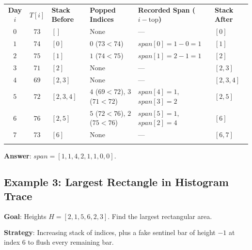 \documentclass[11pt,a4paper]{article}
\theoremstyle{definition}
\begin{document}
\begin{center}
\begingroup
\footnotesize
{}
\begin{tabularx}{\textwidth}{c c >{\raggedright\arraybackslash}p{2.0cm} >{\raggedright\arraybackslash}X >{\raggedright\arraybackslash}X >{\raggedright\arraybackslash}p{1.9cm}}
\arrayrulecolor{primaryblue}\toprule[1.2pt]
\rowcolor{primaryblue!10}
\textcolor{primaryblue}{\textbf{Day $i$}} & \textcolor{primaryblue}{\textbf{$T[i]$}} & \textcolor{primaryblue}{\textbf{Stack Before}} & \textcolor{primaryblue}{\textbf{Popped Indices}} & \textcolor{primaryblue}{\textbf{Recorded Span ($i - \text{top}$)}} & \textcolor{primaryblue}{\textbf{Stack After}} \\
\arrayrulecolor{codeframe}\midrule[0.6pt]
$0$ & $73$ & $[]$ & None & --- & $[0]$ \\
$1$ & $74$ & $[0]$ & $0$ ($73 < 74$) & $span[0] = 1 - 0 = 1$ & $[1]$ \\
$2$ & $75$ & $[1]$ & $1$ ($74 < 75$) & $span[1] = 2 - 1 = 1$ & $[2]$ \\
$3$ & $71$ & $[2]$ & None & --- & $[2, 3]$ \\
$4$ & $69$ & $[2, 3]$ & None & --- & $[2, 3, 4]$ \\
$5$ & $72$ & $[2, 3, 4]$ & $4$ ($69 < 72$), $3$ ($71 < 72$) & $span[4] = 1$, $span[3] = 2$ & $[2, 5]$ \\
$6$ & $76$ & $[2, 5]$ & $5$ ($72 < 76$), $2$ ($75 < 76$) & $span[5] = 1$, $span[2] = 4$ & $[6]$ \\
$7$ & $73$ & $[6]$ & None & --- & $[6, 7]$ \\
\arrayrulecolor{primaryblue}\bottomrule[1.2pt]
\end{tabularx}
\endgroup
\end{center}

\textbf{Answer}: $span = [1, 1, 4, 2, 1, 1, 0, 0]$.

\subsection{Example 3: Largest Rectangle in Histogram Trace}

\textbf{Goal}: Heights $H = [2, 1, 5, 6, 2, 3]$. Find the largest rectangular area.

\textbf{Strategy}: Increasing stack of indices, plus a fake sentinel bar of height $-1$ at index $6$ to flush every remaining bar.
\end{document}
